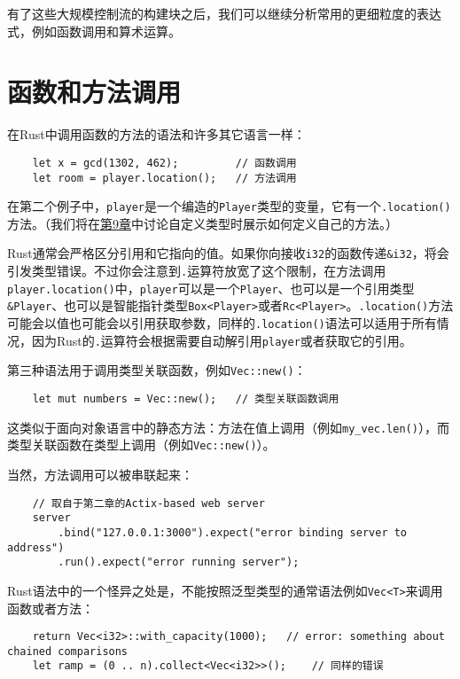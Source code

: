 有了这些大规模控制流的构建块之后，我们可以继续分析常用的更细粒度的表达式，例如函数调用和算术运算。

\section{函数和方法调用}

在Rust中调用函数的方法的语法和许多其它语言一样：
\begin{verbatim}
    let x = gcd(1302, 462);         // 函数调用
    let room = player.location();   // 方法调用
\end{verbatim}

在第二个例子中，\texttt{player}是一个编造的\texttt{Player}类型的变量，它有一个\texttt{.location()}方法。（我们将在\hyperref[ch09]{第9章}中讨论自定义类型时展示如何定义自己的方法。）

Rust通常会严格区分引用和它指向的值。如果你向接收\texttt{i32}的函数传递\texttt{\&i32}，将会引发类型错误。不过你会注意到\texttt{.}运算符放宽了这个限制，在方法调用\texttt{player.location()}中，\texttt{player}可以是一个\texttt{Player}、也可以是一个引用类型\texttt{\&Player}、也可以是智能指针类型\texttt{Box<Player>}或者\texttt{Rc<Player>}。\texttt{.location()}方法可能会以值也可能会以引用获取参数，同样的\texttt{.location()}语法可以适用于所有情况，因为Rust的\texttt{.}运算符会根据需要自动解引用\texttt{player}或者获取它的引用。

第三种语法用于调用类型关联函数，例如\texttt{Vec::new()}：
\begin{verbatim}
    let mut numbers = Vec::new();   // 类型关联函数调用
\end{verbatim}

这类似于面向对象语言中的静态方法：方法在值上调用（例如\texttt{my\_vec.len()}），而类型关联函数在类型上调用（例如\texttt{Vec::new()}）。

当然，方法调用可以被串联起来：
\begin{verbatim}
    // 取自于第二章的Actix-based web server
    server
        .bind("127.0.0.1:3000").expect("error binding server to address")
        .run().expect("error running server");
\end{verbatim}

Rust语法中的一个怪异之处是，不能按照泛型类型的通常语法例如\texttt{Vec<T>}来调用函数或者方法：
\begin{verbatim}
    return Vec<i32>::with_capacity(1000);   // error: something about chained comparisons
    let ramp = (0 .. n).collect<Vec<i32>>();    // 同样的错误
\end{verbatim}

